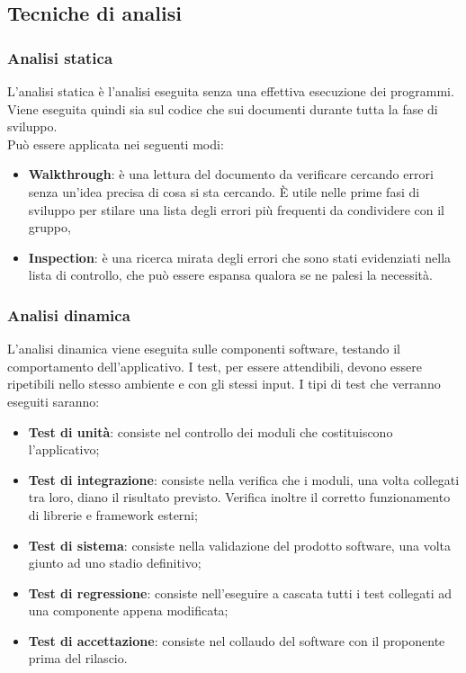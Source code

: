 \documentclass[12pt,a4paper,titlepage]{article}
\begin{document}
	\subsection{Tecniche di analisi}
		\subsubsection{Analisi statica}
		L'analisi statica è l'analisi eseguita senza una effettiva esecuzione dei programmi. Viene eseguita quindi sia sul codice che sui documenti durante tutta la fase di sviluppo.\\
		Può essere applicata nei seguenti modi:
		\begin{itemize}
			\item \textbf{Walkthrough}: è una lettura del documento da verificare cercando errori senza un'idea precisa di cosa si sta cercando. È utile nelle prime fasi di sviluppo per stilare una lista degli errori più frequenti da condividere con il gruppo,
			\item \textbf{Inspection}: è una ricerca mirata degli errori che sono stati evidenziati nella lista di controllo, che può essere espansa qualora se ne palesi la necessità.
		\end{itemize}
	
		\subsubsection{Analisi dinamica}
		L'analisi dinamica viene eseguita sulle componenti software, testando il comportamento dell'applicativo. I test, per essere attendibili, devono essere ripetibili nello stesso ambiente e con gli stessi input.
		I tipi di test che verranno eseguiti saranno:
		\begin{itemize}
			\item \textbf{Test di unità}: consiste nel controllo dei moduli che costituiscono l'applicativo;
			\item \textbf{Test di integrazione}: consiste nella verifica che i moduli, una volta collegati tra loro, diano il risultato previsto. Verifica inoltre il corretto funzionamento di librerie e framework esterni;
			\item \textbf{Test di sistema}: consiste nella validazione del prodotto software, una volta giunto ad uno stadio definitivo;
			\item \textbf{Test di regressione}: consiste nell'eseguire a cascata tutti i test collegati ad una componente appena modificata;
			\item \textbf{Test di accettazione}: consiste nel collaudo del software con il proponente prima del rilascio.
		\end{itemize}
	
\end{document}
